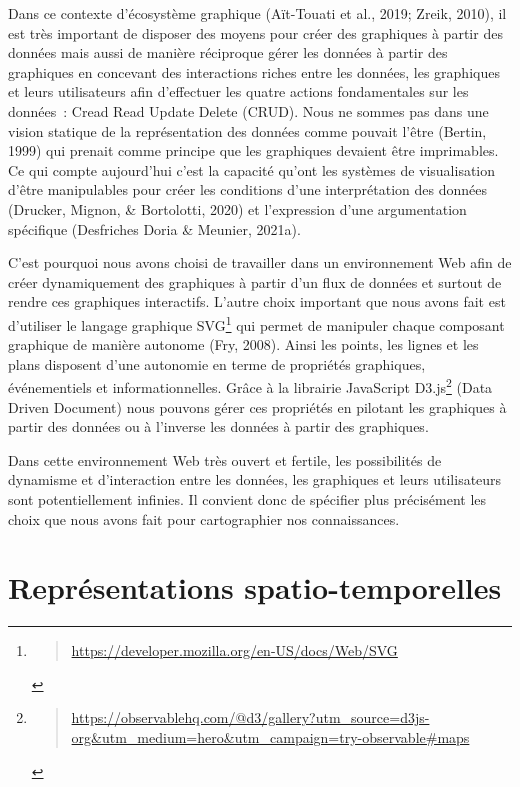 \documentclass[
  a4paper,
  DIV=11,
  numbers=noendperiod]{scrreprt}
\begin{document}
Dans ce contexte d'écosystème graphique (Aït-Touati et al., 2019; Zreik,
2010), il est très important de disposer des moyens pour créer des
graphiques à partir des données mais aussi de manière réciproque gérer
les données à partir des graphiques en concevant des interactions riches
entre les données, les graphiques et leurs utilisateurs afin d'effectuer
les quatre actions fondamentales sur les données~: Cread Read Update
Delete (CRUD). Nous ne sommes pas dans une vision statique de la
représentation des données comme pouvait l'être (Bertin, 1999) qui
prenait comme principe que les graphiques devaient être imprimables. Ce
qui compte aujourd'hui c'est la capacité qu'ont les systèmes de
visualisation d'être manipulables pour créer les conditions d'une
interprétation des données (Drucker, Mignon, \& Bortolotti, 2020) et
l'expression d'une argumentation spécifique (Desfriches Doria \&
Meunier, 2021a).

C'est pourquoi nous avons choisi de travailler dans un environnement Web
afin de créer dynamiquement des graphiques à partir d'un flux de données
et surtout de rendre ces graphiques interactifs. L'autre choix important
que nous avons fait est d'utiliser le langage graphique SVG\footnote{\begin{quote}
  \url{https://developer.mozilla.org/en-US/docs/Web/SVG}
  \end{quote}} qui permet de manipuler chaque composant graphique de
manière autonome (Fry, 2008). Ainsi les points, les lignes et les plans
disposent d'une autonomie en terme de propriétés graphiques,
événementiels et informationnelles. Grâce à la librairie JavaScript
D3.js\footnote{\begin{quote}
  \url{https://observablehq.com/@d3/gallery?utm_source=d3js-org&utm_medium=hero&utm_campaign=try-observable\#maps}
  \end{quote}} (Data Driven Document) nous pouvons gérer ces propriétés
en pilotant les graphiques à partir des données ou à l'inverse les
données à partir des graphiques.

Dans cette environnement Web très ouvert et fertile, les possibilités de
dynamisme et d'interaction entre les données, les graphiques et leurs
utilisateurs sont potentiellement infinies. Il convient donc de
spécifier plus précisément les choix que nous avons fait pour
cartographier nos connaissances.

\section{Représentations spatio-temporelles}\label{sec-repSpatioTempo}
\end{document}
